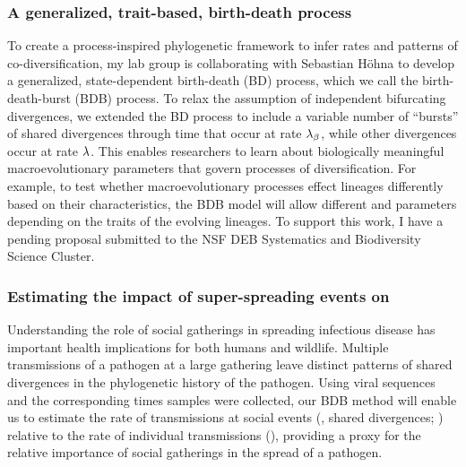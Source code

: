 \subsubsection*{A generalized, trait-based, birth-death process}
To create a process-inspired phylogenetic framework to infer rates and patterns
of co-diversification,
my lab group is collaborating with Sebastian H\"ohna to develop a
generalized, state-dependent birth-death (BD) process, which we call the
birth-death-burst (BDB) process.
To relax the assumption of independent bifurcating divergences, we extended the
BD process to include a variable number of ``bursts'' of shared divergences through time that
occur at rate $\lambda_{\beta}$, while other divergences occur
at rate $\lambda$.
This enables researchers to learn about biologically
meaningful macroevolutionary parameters that govern processes of
diversification.
For example, to test whether macroevolutionary processes effect
lineages differently based on their characteristics, the BDB model will allow
different \speciationrate and \burstrate parameters depending on the traits of
the evolving lineages. 
To support this work, I have a pending proposal submitted to the NSF DEB
Systematics and Biodiversity Science Cluster.

\subsubsection*{Estimating the impact of super-spreading events on \covid}
Understanding the role of social gatherings in spreading infectious disease
has important health implications for both humans and wildlife.
Multiple transmissions of a pathogen at a large gathering leave distinct
patterns of shared divergences in the phylogenetic history of the pathogen.
Using viral sequences and the corresponding times samples were collected, our
BDB method will enable us to estimate the rate of transmissions at social
events (\ie, shared divergences; \burstrate) relative to the rate of individual
transmissions (\speciationrate),
providing a proxy for the relative importance of social gatherings
in the spread of a pathogen.

